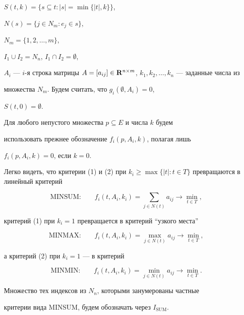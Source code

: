 $S( t, k)=\{s \subseteq t : |s|=\min \{|t|, k \} \}$,


$N(s)=\{j \in N_m : e_j \in s \}$,


$N_m=\{1, 2,\dotsc, m \}$,


$I_1 \cup I_2=N_n$, $I_1 \cap I_2=\emptyset$,


$A_i$ --- $i$-я строка матрицы $A=[a_{ij}] \in \bold{R}^{n


\times m}$, $k_1, k_2,\dotsc, k_n$ --- заданные числа из


множества $N_m$. Будем считать, что $g_i(\emptyset, A_i)=0$,


$S(t, 0)=\emptyset$.





Для любого непустого множества $p\subseteq E$ и числа $k$ будем


использовать прежнее обозначение $f_i(p, A_i, k)$, полагая лишь


$f_i(p, A_i, k)=0$, если $k=0$.





Легко видеть, что критерии (1) и (2) при $k_i\geq\max\{|t| :


t \in T \}$ превращаются в линейный критерий


$$


\text{MINSUM:} \qquad f_i(t, A_i, k_i)=


\sum_{j \in N(t)}a_{ij} \longrightarrow \min_{t \in T},


$$


критерий (1) при $k_i=1$ превращается в критерий ``узкого места''


$$


\text{MINMAX:} \qquad f_i(t, A_i,


k_i)=\max_{j \in N(t)}a_{ij}\longrightarrow \min_{t \in T},


$$


а критерий (2) при $k_i=1$ --- в критерий


$$


\text{MINMIN:} \qquad f_i(t, A_i,


k_i)=\min_{j \in N(t)}a_{ij}\longrightarrow \min_{t \in T}.


$$





Множество тех индексов из $N_n$, которыми занумерованы частные


критерии вида MINSUM, будем обозначать через $I_{\mathrm{SUM}}$.





